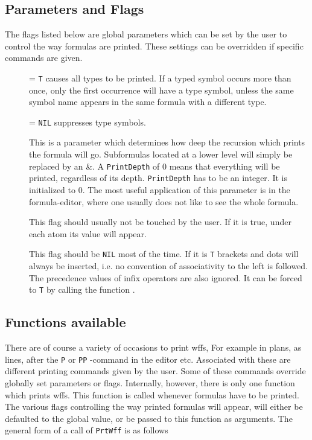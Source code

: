 \subsection{Parameters and Flags}\label{Printing Flags}
The flags listed below are global parameters which can be set by the user
to control the way formulas are printed. These settings can be overridden
if specific commands are given.

\begin{description}

\item [] = {\tt T} causes all types to be printed. 
	If a typed symbol occurs more than once, only the first occurrence
	will have a type symbol, unless the same symbol name appears in the
	same formula with a different type.

 = {\tt NIL} suppresses type symbols.

\item [] This is a parameter which determines how deep the recursion
	which prints the formula will go.  Subformulas located at a lower
	level will simply be replaced by an \&.  A {\tt PrintDepth} of 0 means
	that everything will be printed, regardless of its depth.  {\tt PrintDepth}
	has to be an integer. It is initialized to 0. The most useful
	application of this parameter is in the formula-editor, where one
	usually does not like to see the whole formula.

\item [] This flag should usually not be touched by the user. If it
	is true, under each atom its value will appear.

\item [] This flag should be {\tt NIL} most of the time. If it is
	{\tt T} brackets and dots will always be inserted, i.e. no
	convention of associativity to the left is followed. The
	precedence values of infix operators are also ignored.
	It can be forced to {\tt T} by calling the function
	{\w {}}.
\end{description}

\subsection{Functions available}\label{Printing Functions}

There are of course a variety of occasions to print wffs, For example in plans,
as lines, after the {\tt P} or {\tt PP} -command in the editor etc.
Associated with these are different printing commands given 
by the user. Some of these commands override globally set parameters or
flags. Internally, however, there is only one function which prints wffs.
This function  is called whenever formulas have to be 
printed.  The various flags controlling the way printed formulas will appear,
will either be defaulted to the global value, or be passed to this
function as arguments. The general form of a call of {\tt PrtWff} is as follows

